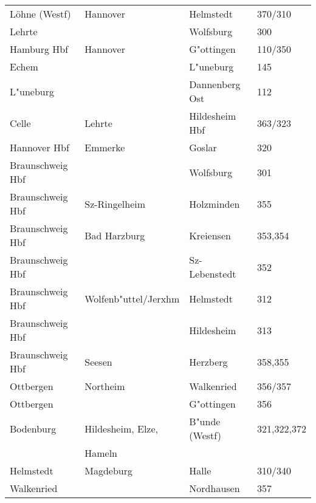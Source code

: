\begin{tabular}{l|l|l|l}
	Löhne (Westf)    & Hannover             & Helmstedt          & 370/310\\
	Lehrte           &                      & Wolfsburg          & 300\\
	Hamburg Hbf      & Hannover             & G"ottingen         & 110/350\\
	Echem            &                      & L"uneburg          & 145\\
	L"uneburg        &                      & Dannenberg Ost     & 112\\
	Celle            & Lehrte               & Hildesheim Hbf     & 363/323\\
	Hannover Hbf     & Emmerke              & Goslar             & 320\\
	Braunschweig Hbf &                      & Wolfsburg          & 301\\
	Braunschweig Hbf & Sz-Ringelheim        & Holzminden         & 355\\
	Braunschweig Hbf & Bad Harzburg         & Kreiensen          & 353,354\\
	Braunschweig Hbf &                      & Sz-Lebenstedt      & 352\\
	Braunschweig Hbf & Wolfenb"uttel/Jerxhm & Helmstedt          & 312\\
	Braunschweig Hbf &                      & Hildesheim         & 313\\
	Braunschweig Hbf & Seesen               & Herzberg           & 358,355\\
	Ottbergen        & Northeim             & Walkenried         & 356/357\\
	Ottbergen        &                      & G"ottingen         & 356\\
	Bodenburg        & Hildesheim, Elze,    & B"unde (Westf)     & 321,322,372\\
	                 & Hameln               &                    & \\
	Helmstedt        & Magdeburg            & Halle              & 310/340\\
	Walkenried       &                      & Nordhausen         & 357\\
\end{tabular}

\ifpdf

\fi
